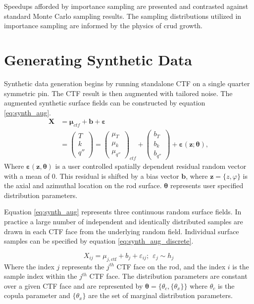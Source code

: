 Speedups afforded by importance sampling are presented and contrasted against standard Monte Carlo sampling results.  The sampling distributions utilized in importance sampling are informed by the physics of crud growth.

\section{Generating Synthetic Data}

Synthetic data generation begins by running standalone CTF on a single quarter symmetric pin.   The CTF result is then augmented with tailored noise.  The augmented synthetic surface fields can be constructed by equation \ref{eq:synth_aug}.
\begin{align}
    \bm X &= \bm \mu_{ctf} + \bm b + \bm \varepsilon \nonumber \\
          &=
    \begin{pmatrix}
        T \\
        k \\
        q''
    \end{pmatrix}
    =
    \begin{pmatrix}
        \mu_{T} \\
        \mu_k \\
        \mu_{q''}
    \end{pmatrix}_{ctf}
    + \begin{pmatrix}
        b_{T} \\
        b_k \\
        b_{q''}
    \end{pmatrix}
    + \bm{\varepsilon} (\mathbf z; \bm \theta),
\label{eq:synth_aug}
\end{align}
Where $\bm \varepsilon(\mathbf z, \bm \theta)$ is a user controlled spatially dependent residual random vector with a mean of 0.  This residual is
shifted by a bias vector
$\mathbf b$, where $\mathbf z=\{z, \varphi\}$ is the axial and azimuthal location on the rod surface.
$\bm \theta$ represents user specified distribution parameters.

Equation \ref{eq:synth_aug} represents three continuous random surface fields.  In practice a large number of independent and identically distributed samples are drawn in each CTF face from the underlying random field.  Individual surface samples can be specified by equation \ref{eq:synth_aug_discrete}.

\begin{equation}
    X_{ij} = \mu_{j,\mathrm{ctf}} + b_j + \varepsilon_{ij};\ \   \varepsilon_{j} \sim h_j
    \label{eq:synth_aug_discrete}
\end{equation}
Where the index $j$ represents the $j^{th}$ CTF face on the rod, and the index $i$ is the sample index within the $j^{th}$ CTF face.  The distribution parameters are constant over a given CTF face and are represented by $\bm \theta = \{\theta_c, \{\theta_x\}\}$ where $\theta_c$ is the copula parameter and  $\{\theta_x\}$ are the set of marginal distribution parameters.

